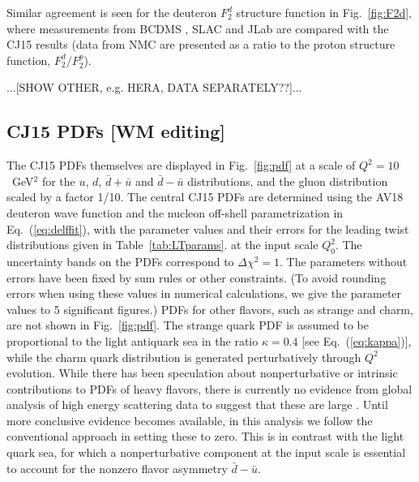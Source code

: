 \documentclass[aps,prd,amsmath,preprint]{revtex4}
\begin{document}
Similar agreement is seen for the deuteron $F_2^d$ structure function
in Fig.~\ref{fig:F2d}, where measurements from BCDMS \cite{BCDMS},
SLAC \cite{SLAC} and JLab \cite{Malace} are compared with the CJ15
results (data from NMC are presented as a ratio to the proton
structure function, $F_2^d/F_2^p$).

{\color{red} ...[SHOW OTHER, e.g. HERA, DATA SEPARATELY??]...}




\subsection{CJ15 PDFs {\color{red} [WM editing]}}
\label{ssec:CJ15pdfs}

The CJ15 PDFs themselves are displayed in Fig.~\ref{fig:pdf} at a
scale of $Q^2=10$~GeV$^2$ for the $u$, $d$, $\bar d + \bar u$ and
$\bar d - \bar u$ distributions, and the gluon distribution scaled
by a factor 1/10.  The central CJ15 PDFs are determined using the
AV18 deuteron wave function and the nucleon off-shell parametrization
in Eq.~(\ref{eq:delffit}), with the parameter values and their errors
for the leading twist distributions given in Table~\ref{tab:LTparams}.
at the input scale $Q_0^2$.  The uncertainty bands on the PDFs
correspond to $\Delta\chi^2=1$.  The parameters without errors
have been fixed by sum rules or other constraints.
(To avoid rounding errors when using these values in numerical
calculations, we give the parameter values to 5 significant figures.)
%
PDFs for other flavors, such as strange and charm, are not shown
in Fig.~\ref{fig:pdf}.  The strange quark PDF is assumed to be
proportional to the light antiquark sea in the ratio $\kappa = 0.4$
[see Eq.~(\ref{eq:kappa})], while the charm quark distribution is
generated perturbatively through $Q^2$ evolution.
While there has been speculation about nonperturbative or intrinsic
contributions to PDFs of heavy flavors, there is currently no evidence
from global analysis of high energy scattering data to suggest that
these are large \cite{PedroIC15}.  Until more conclusive evidence
becomes available, in this analysis we follow the conventional
approach in setting these to zero.
This is in contrast with the light quark sea, for which a
nonperturbative component at the input scale is essential to
account for the nonzero flavor asymmetry $\bar d-\bar u$.
\end{document}
